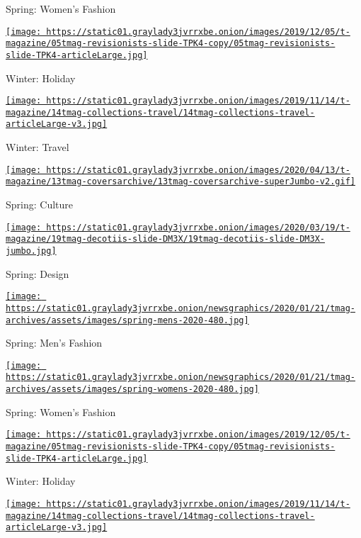Spring: Women's Fashion

\href{https://www.nytimes3xbfgragh.onion/issue/t-magazine/2019/11/21/ts-dec-8-holiday-issue}{\texttt{[image: https://static01.graylady3jvrrxbe.onion/images/2019/12/05/t-magazine/05tmag-revisionists-slide-TPK4-copy/05tmag-revisionists-slide-TPK4-articleLarge.jpg]}}

Winter: Holiday

\href{https://www.nytimes3xbfgragh.onion/issue/t-magazine/2019/11/04/ts-nov-17-travel-issue}{\texttt{[image: https://static01.graylady3jvrrxbe.onion/images/2019/11/14/t-magazine/14tmag-collections-travel/14tmag-collections-travel-articleLarge-v3.jpg]}}

Winter: Travel

\href{https://www.nytimes3xbfgragh.onion/issue/t-magazine/2020/04/12/ts-april-19-culture-issue}{\texttt{[image: https://static01.graylady3jvrrxbe.onion/images/2020/04/13/t-magazine/13tmag-coversarchive/13tmag-coversarchive-superJumbo-v2.gif]}}

Spring: Culture

\href{https://www.nytimes3xbfgragh.onion/issue/t-magazine/2020/03/06/ts-march-22-design-issue}{\texttt{[image: https://static01.graylady3jvrrxbe.onion/images/2020/03/19/t-magazine/19tmag-decotiis-slide-DM3X/19tmag-decotiis-slide-DM3X-jumbo.jpg]}}

Spring: Design

\href{https://www.nytimes3xbfgragh.onion/issue/t-magazine/2020/02/21/ts-march-8-mens-fashion-issue}{\texttt{[image: https://static01.graylady3jvrrxbe.onion/newsgraphics/2020/01/21/tmag-archives/assets/images/spring-mens-2020-480.jpg]}}

Spring: Men's Fashion

\href{https://www.nytimes3xbfgragh.onion/issue/t-magazine/2020/02/06/ts-feb-23-womens-fashion-issue}{\texttt{[image: https://static01.graylady3jvrrxbe.onion/newsgraphics/2020/01/21/tmag-archives/assets/images/spring-womens-2020-480.jpg]}}

Spring: Women's Fashion

\href{https://www.nytimes3xbfgragh.onion/issue/t-magazine/2019/11/21/ts-dec-8-holiday-issue}{\texttt{[image: https://static01.graylady3jvrrxbe.onion/images/2019/12/05/t-magazine/05tmag-revisionists-slide-TPK4-copy/05tmag-revisionists-slide-TPK4-articleLarge.jpg]}}

Winter: Holiday

\href{https://www.nytimes3xbfgragh.onion/issue/t-magazine/2019/11/04/ts-nov-17-travel-issue}{\texttt{[image: https://static01.graylady3jvrrxbe.onion/images/2019/11/14/t-magazine/14tmag-collections-travel/14tmag-collections-travel-articleLarge-v3.jpg]}}

